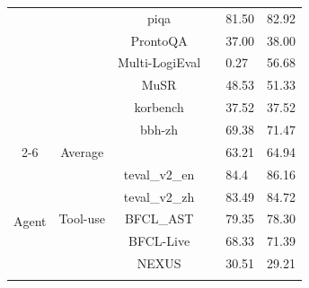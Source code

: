 \begin{table}[h]
\begin{tabular}{ccccll}
                                     &                                                                                                 & piqa                &  & 81.50  & 82.92 \\
                                     &                                                                                                 & ProntoQA            &  & 37.00    & 38.00    \\
                                     &                                                                                                 & Multi-LogiEval      &  & 0.27  & 56.68 \\
                                     &                                                                                                 & MuSR                &  & 48.53 & 51.33 \\
                                     &                                                                                                 & korbench            &  & 37.52 & 37.52 \\
                                     &                                                                                                 & bbh-zh              &  & 69.38 & 71.47 \\ \cmidrule{2-6} 
                                     & {Average}                                                                                &                     &  & 63.21 & 64.94 \\ \midrule
\multirow{9}{*}{{Agent}}      & \multirow{5}{*}{{Tool-use}}                                                              & teval\_v2\_en       &  & 84.4  & 86.16 \\
                                     &                                                                                                 & teval\_v2\_zh       &  & 83.49 & 84.72 \\
                                     &                                                                                                 & BFCL\_AST           &  & 79.35 & 78.30  \\
                                     &                                                                                                 & BFCL-Live           &  & 68.33 & 71.39 \\
                                     &                                                                                                 & NEXUS               &  & 30.51 & 29.21 \\ \cmidrule{2-6} 

\end{tabular}
\end{table}
